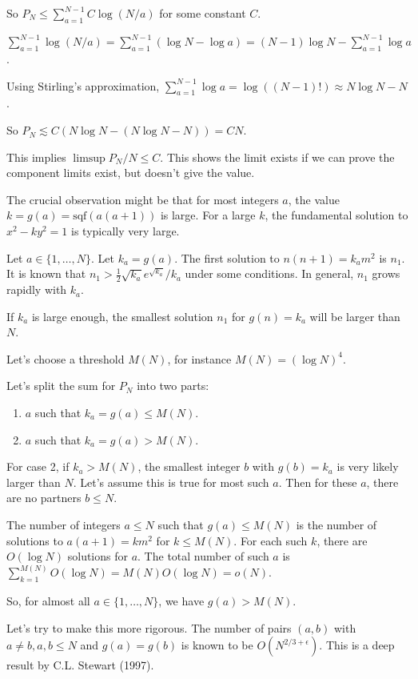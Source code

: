 \documentclass[12pt,a4paper]{article}
\theoremstyle{definition}
\begin{document}
    So $P_N \leq \sum_{a=1}^{N-1} C \log(N/a)$ for some constant $C$.

    $\sum_{a=1}^{N-1} \log(N/a) = \sum_{a=1}^{N-1} (\log N - \log a) = (N-1)\log N - \sum_{a=1}^{N-1} \log a$.

    Using Stirling's approximation, $\sum_{a=1}^{N-1} \log a = \log((N-1)!) \approx N\log N - N$.

    So $P_N \lesssim C(N\log N - (N\log N - N)) = CN$.

    This implies $\limsup P_N/N \leq C$. This shows the limit exists if we can prove the component limits exist, but doesn't give the value.

    The crucial observation might be that for most integers $a$, the value $k=g(a)=\text{sqf}(a(a+1))$ is large. For a large $k$, the fundamental solution to $x^2-ky^2=1$ is typically very large.

    Let $a \in \{1,\dots,N\}$. Let $k_a=g(a)$. The first solution to $n(n+1)=k_a m^2$ is $n_1$. It is known that $n_1 > \frac{1}{2} \sqrt{k_a} e^{\sqrt{k_a}}/k_a$ under some conditions. In general, $n_1$ grows rapidly with $k_a$.

    If $k_a$ is large enough, the smallest solution $n_1$ for $g(n)=k_a$ will be larger than $N$.

    Let's choose a threshold $M(N)$, for instance $M(N) = (\log N)^4$.

    Let's split the sum for $P_N$ into two parts:
    \begin{enumerate}
        \item $a$ such that $k_a=g(a) \leq M(N)$.
        \item $a$ such that $k_a=g(a) > M(N)$.
    \end{enumerate}

    For case 2, if $k_a > M(N)$, the smallest integer $b$ with $g(b)=k_a$ is very likely larger than $N$. Let's assume this is true for most such $a$. Then for these $a$, there are no partners $b \leq N$.

    The number of integers $a \leq N$ such that $g(a) \leq M(N)$ is the number of solutions to $a(a+1)=km^2$ for $k \leq M(N)$. For each such $k$, there are $O(\log N)$ solutions for $a$. The total number of such $a$ is $\sum_{k=1}^{M(N)} O(\log N) = M(N) O(\log N) = o(N)$.

    So, for almost all $a \in \{1,\dots,N\}$, we have $g(a) > M(N)$.

    Let's try to make this more rigorous. The number of pairs $(a,b)$ with $a \neq b, a,b \leq N$ and $g(a)=g(b)$ is known to be $O(N^{2/3+\epsilon})$. This is a deep result by C.L. Stewart (1997).
\end{document}
